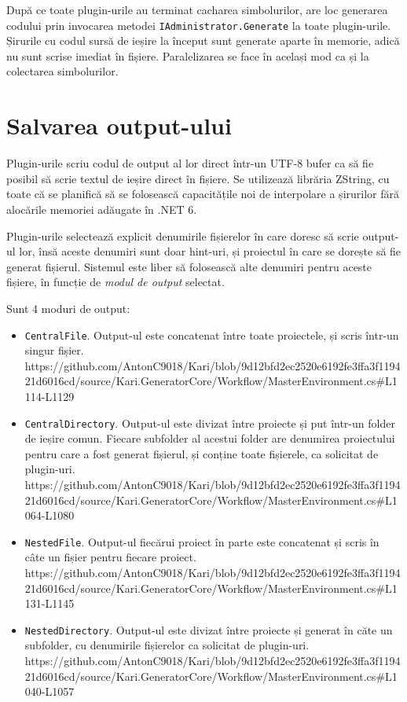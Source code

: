 \documentclass{report}
\begin{document}
După ce toate plugin-urile au terminat cacharea simbolurilor, are loc generarea codului prin invocarea metodei \texttt{IAdministrator.Generate} la toate plugin-urile.
Șirurile cu codul sursă de ieșire la început sunt generate aparte în memorie, adică nu sunt scrise imediat în fișiere.
Paralelizarea se face în același mod ca și la colectarea simbolurilor.

\section{Salvarea output-ului}

Plugin-urile scriu codul de output al lor direct într-un UTF-8 bufer ca să fie posibil să scrie textul de ieșire direct în fișiere.
Se utilizează librăria ZString\cite{zstring_github}, cu toate că se planifică să se folosească capacitățile noi de interpolare a șirurilor fără alocările memoriei adăugate în .NET 6.\cite{string_interpolation_csharp_10}

Plugin-urile selectează explicit denumirile fișierelor în care doresc să scrie output-ul lor, însă aceste denumiri sunt doar hint-uri, și proiectul în care se dorește să fie generat fișierul.
Sistemul este liber să folosească alte denumiri pentru aceste fișiere, în funcție de \emph{modul de output} selectat.

Sunt 4 moduri de output:

\begin{itemize}
\item \texttt{CentralFile}. Output-ul este concatenat între toate proiectele, și scris într-un singur fișier.
  https://github.com/AntonC9018/Kari/blob/9d12bfd2ec2520e6192fe3ffa3f119421d6016cd/source/Kari.GeneratorCore/Workflow/MasterEnvironment.cs#L1114-L1129

\item \texttt{CentralDirectory}. Output-ul este divizat între proiecte și put într-un folder de ieșire comun.
  Fiecare subfolder al acestui folder are denumirea proiectului pentru care a fost generat fișierul, și conține toate fișierele, ca solicitat de plugin-uri.
  https://github.com/AntonC9018/Kari/blob/9d12bfd2ec2520e6192fe3ffa3f119421d6016cd/source/Kari.GeneratorCore/Workflow/MasterEnvironment.cs#L1064-L1080

\item \texttt{NestedFile}. Output-ul fiecărui proiect în parte este concatenat și scris în câte un fișier pentru fiecare proiect.
  https://github.com/AntonC9018/Kari/blob/9d12bfd2ec2520e6192fe3ffa3f119421d6016cd/source/Kari.GeneratorCore/Workflow/MasterEnvironment.cs#L1131-L1145

\item \texttt{NestedDirectory}. Output-ul este divizat între proiecte și generat în căte un subfolder, cu denumirile fișierelor ca solicitat de plugin-uri.
  https://github.com/AntonC9018/Kari/blob/9d12bfd2ec2520e6192fe3ffa3f119421d6016cd/source/Kari.GeneratorCore/Workflow/MasterEnvironment.cs#L1040-L1057
\end{itemize}
\end{document}
